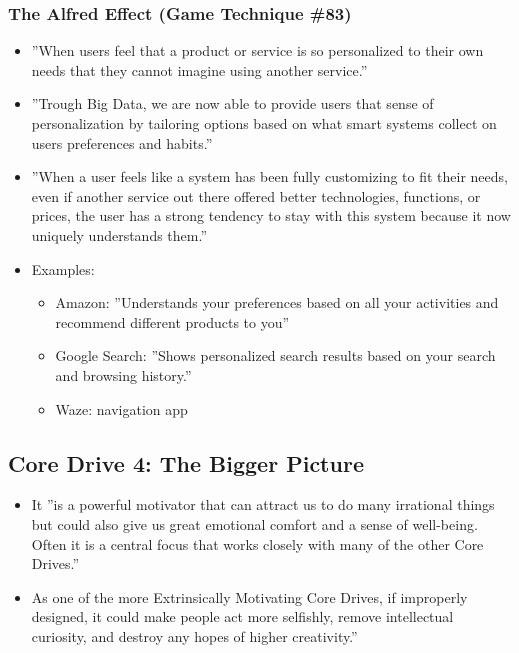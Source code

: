 \subsubsection{The Alfred Effect (Game Technique \#83)}
    \begin{itemize}
        \item ''When users feel that a product or service is so personalized to their own needs that they cannot imagine using another service.''
        \item ''Trough Big Data, we are now able to provide users that sense of personalization by tailoring options based on what smart systems collect on users preferences and habits.''
        \item ''When a user feels like a system has been fully customizing to fit their needs, even if another service out there offered better technologies, functions, or prices, the user has a strong tendency to stay with this system because it now uniquely understands them.''
        \item Examples:
        \begin{itemize}
            \item Amazon: ''Understands your preferences based on all your activities and recommend different products to you''
            \item Google Search: ''Shows personalized search results based on your search and browsing history.''
            \item Waze: navigation app
        \end{itemize}
    \end{itemize}
    
    
\subsection{Core Drive 4: The Bigger Picture}
\begin{itemize}
    \item It ''is a powerful motivator that can attract us to do many irrational things but could also give us great emotional comfort and a sense of well-being. Often it is a central focus that works closely with many of the other Core Drives.''
    \item As one of the more Extrinsically Motivating Core Drives, if improperly designed, it could make people act more selfishly, remove intellectual curiosity, and destroy any hopes of higher creativity.''
\end{itemize}